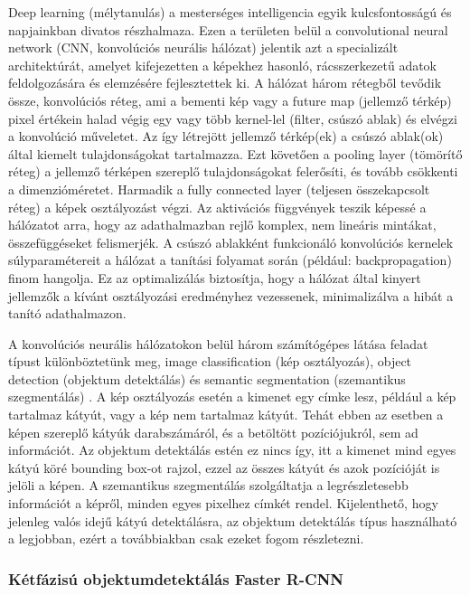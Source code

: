 Deep learning (mélytanulás) a mesterséges intelligencia egyik
kulcsfontosságú és napjainkban divatos részhalmaza. Ezen a területen
belül a convolutional neural network (CNN, konvolúciós neurális hálózat)
jelentik azt a specializált architektúrát, amelyet kifejezetten a
képekhez hasonló, rácsszerkezetű adatok feldolgozására és elemzésére
fejlesztettek ki. A hálózat három rétegből tevődik össze, konvolúciós
réteg, ami a bementi kép vagy a future map (jellemző térkép) pixel
értékein halad végig egy vagy több kernel-lel (filter, csúszó ablak) és
elvégzi a konvolúció műveletet. Az így létrejött jellemző térkép(ek) a
csúszó ablak(ok) által kiemelt tulajdonságokat tartalmazza. Ezt követően
a pooling layer (tömörítő réteg) a jellemző térképen szereplő
tulajdonságokat felerősíti, és tovább csökkenti a dimenzióméretet.
Harmadik a fully connected layer (teljesen összekapcsolt réteg) a képek
osztályozást végzi. Az aktivációs függvények teszik képessé a hálózatot
arra, hogy az adathalmazban rejlő komplex, nem lineáris mintákat,
összefüggéseket felismerjék. A csúszó ablakként funkcionáló konvolúciós
kernelek súlyparamétereit a hálózat a tanítási folyamat során (például:
backpropagation) finom hangolja. Ez az optimalizálás biztosítja, hogy a
hálózat által kinyert jellemzők a kívánt osztályozási eredményhez
vezessenek, minimalizálva a hibát a tanító adathalmazon. \cite{rComprehensiveReviewAsphalt2022}

A konvolúciós neurális hálózatokon belül három számítógépes látása
feladat típust különböztetünk meg, image classification (kép
osztályozás), object detection (objektum detektálás) és semantic
segmentation (szemantikus szegmentálás) \cite{rComprehensiveReviewAsphalt2022}. A kép osztályozás
esetén a kimenet egy címke lesz, például a kép tartalmaz kátyút, vagy a
kép nem tartalmaz kátyút. Tehát ebben az esetben a képen szereplő kátyúk
darabszámáról, és a betöltött pozíciójukról, sem ad információt. Az
objektum detektálás estén ez nincs így, itt a kimenet mind egyes kátyú
köré bounding box-ot rajzol, ezzel az összes kátyút és azok pozícióját
is jelöli a képen. A szemantikus szegmentálás szolgáltatja a
legrészletesebb információt a képről, minden egyes pixelhez címkét
rendel. Kijelenthető, hogy jelenleg valós idejű kátyú detektálásra, az
objektum detektálás típus használható a legjobban, ezért a továbbiakban
csak ezeket fogom részletezni. \cite{maComputerVisionRoad2022}

\subsubsection{Kétfázisú objektumdetektálás Faster
	R-CNN}

